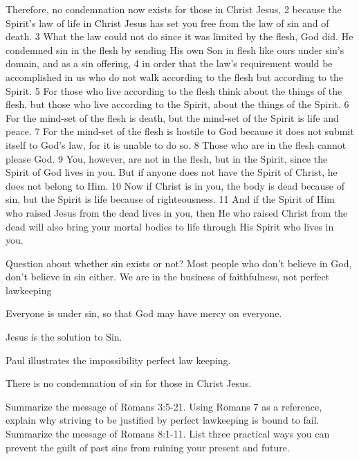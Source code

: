 \begin{bible}
Therefore, no condemnation now exists for those in Christ Jesus, 2 because the Spirit's law of life in Christ Jesus has set you free from the law of sin and of death. 3 What the law could not do since it was limited by the flesh, God did. He condemned sin in the flesh by sending His own Son in flesh like ours under sin's domain, and as a sin offering, 4 in order that the law's requirement would be accomplished in us who do not walk according to the flesh but according to the Spirit. 5 For those who live according to the flesh think about the things of the flesh, but those who live according to the Spirit, about the things of the Spirit. 6 For the mind-set of the flesh is death, but the mind-set of the Spirit is life and peace. 7 For the mind-set of the flesh is hostile to God because it does not submit itself to God's law, for it is unable to do so. 8 Those who are in the flesh cannot please God. 9 You, however, are not in the flesh, but in the Spirit, since the Spirit of God lives in you. But if anyone does not have the Spirit of Christ, he does not belong to Him. 10 Now if Christ is in you, the body is dead because of sin, but the Spirit is life because of righteousness. 11 And if the Spirit of Him who raised Jesus from the dead lives in you, then He who raised Christ from the dead will also bring your mortal bodies to life through His Spirit who lives in you.

\end{bible}

\begin{discussion}

Question about whether sin exists or not? Most people who don't believe in God, don't believe in sin either.
We are in the business of faithfulness, not perfect lawkeeping


 Everyone is under sin, so that God may have mercy on everyone.

 Jesus is the solution to Sin.


 Paul illustrates the impossibility perfect law keeping.


 There is no condemnation of sin for those in Christ Jesus.

\end{discussion}

\begin{questions}
\q Summarize the message of Romans 3:5-21.
\q Using Romans 7 as a reference, explain why striving to be justified by perfect lawkeeping is bound to fail.
\q Summarize the message of Romans 8:1-11.
\q List three practical ways you can prevent the guilt of past sins from ruining your present and future.
\end{questions}